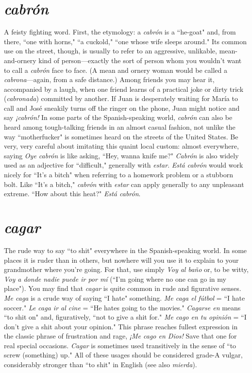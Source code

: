 \section{\emph{cabrón}}

A feisty fighting word. First, the etymology: a \emph{cabrón} is a ``he-goat" and, from there, ``one with horns," ``a cuckold," ``one whose wife
sleeps around." Its common use on the street, though, is usually to
refer to an aggressive, unlikable, mean-and-ornery kind of person---exactly the sort of person whom you wouldn't want to call a \emph{cabrón}
face to face. (A mean and ornery woman would be called a \emph{cabrona}---again, from a safe distance.) Among friends you may hear it, accompanied by a laugh, when one friend learns of a practical joke or dirty trick
(\emph{cabronada}) committed by another. If Juan is desperately waiting for
María to call and José sneakily turns off the ringer on the phone, Juan
might notice and say \emph{¡cabrón!} In some parts of the Spanish-speaking
world, \emph{cabrón} can also be heard among tough-talking friends in an almost casual fashion, not unlike the way ``motherfucker" is sometimes
heard on the streets of the United States. Be very, very careful about
imitating this quaint local custom: almost everywhere, saying \emph{Oye cabrón} is like asking, ``Hey, wanna knife me?" \emph{Cabrón} is also widely
used as an adjective for ``difficult," generally with \emph{estar}. \emph{Está cabrón}
would work nicely for ``It's a bitch" when referring to a homework
problem or a stubborn bolt. Like ``It's a bitch," \emph{cabrón} with \emph{estar} can
apply generally to any unpleasant extreme. ``How about this heat?"
\emph{Está cabrón}.

\section{\emph{cagar}}

The rude way to say ``to shit" everywhere in the Spanish-speaking world. In some places it is ruder than in others, but nowhere
will you use it to explain to your grandmother where you're going. For
that, use simply \emph{Voy al baño} or, to be witty, \emph{Voy a donde nadie puede
ir por mí} (``I'm going where no one can go in my place").
You may find that \emph{cagar} is quite common in rude and figurative senses. \emph{Me caga} is a crude way of saying ``I hate" something. \emph{Me
caga el fútbol} = ``I hate soccer." \emph{Le caga ir al cine} = ``He hates going
to the movies." \emph{Cagarse en} means ``to shit on" and, figuratively, ``not
to give a shit for." \emph{Me cago en tu opinión} = ``I don't give a shit about
your opinion." This phrase reaches fullest expression in the classic
phrase of frustration and rage, \emph{¡Me cago en Dios!} Save that one for real
special occasions. \emph{Cagar} is sometimes used transitively in the sense of
``to screw (something) up." All of these usages should be considered
grade-A vulgar, considerably stronger than ``to shit" in English (see
also \emph{mierda}).

